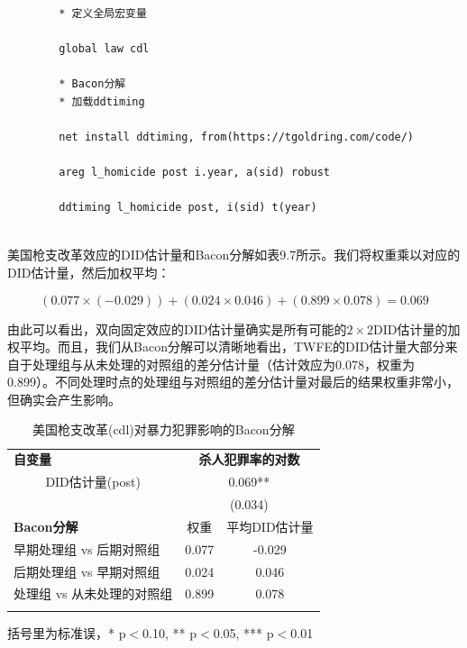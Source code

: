 \documentclass[cn,12pt,math=newtx,citestyle=gb7714-2015,bibstyle=gb7714-2015]{elegantbook}
\begin{document}
    \begin{lstlisting}
    	
    	* 定义全局宏变量
    	
    	global law cdl  
    	
    	* Bacon分解
    	* 加载ddtiming
    	
    	net install ddtiming, from(https://tgoldring.com/code/)
    	
    	areg l_homicide post i.year, a(sid) robust
    	
    	ddtiming l_homicide post, i(sid) t(year)
    	
    \end{lstlisting}
    
    美国枪支改革效应的DID估计量和Bacon分解如表9.7所示。我们将权重乘以对应的DID估计量，然后加权平均：
    
    $$(0.077 \times (-0.029)) + (0.024 \times 0.046) + (0.899 \times 0.078) = 0.069$$
    
    由此可以看出，双向固定效应的DID估计量确实是所有可能的$2 \times 2$DID估计量的加权平均。而且，我们从Bacon分解可以清晰地看出，TWFE的DID估计量大部分来自于处理组与从未处理的对照组的差分估计量（估计效应为0.078，权重为0.899）。不同处理时点的处理组与对照组的差分估计量对最后的结果权重非常小，但确实会产生影响。
    
    	\begin{table}[htbp]\centering
    	\scriptsize
    	\caption{美国枪支改革(cdl)对暴力犯罪影响的Bacon分解}
    	\label{DID_2}
    	\begin{center}
    		\begin{threeparttable}
    			\begin{tabular}{l*{2}{c}}
    				\toprule
    				\multicolumn{1}{l}{\textbf{自变量}}&
    				\multicolumn{2}{c}{\textbf{杀人犯罪率的对数}}\\
    				\multicolumn{1}{c}{DID估计量(post)}&
    				\multicolumn{2}{c}{0.069**} \\
    				\multicolumn{1}{c}{}& 
    				\multicolumn{2}{c}{(0.034)}\\
    				\midrule
    				\textbf{Bacon分解} &权重&平均DID估计量\\
    				早期处理组 vs 后期对照组               &      0.077&-0.029      \\
    				后期处理组 vs 早期对照组 &   0.024   &    0.046   \\
    				处理组 vs 从未处理的对照组        &     0.899&0.078      \\
    				
    				\\
    				\bottomrule
    			\end{tabular}
    			\begin{tablenotes}
    				\tiny
    				\item 括号里为标准误，* p$<$0.10, ** p$<$0.05, *** p$<$0.01
    			\end{tablenotes}
    		\end{threeparttable}
    	\end{center}
    \end{table}
    
\end{document}
